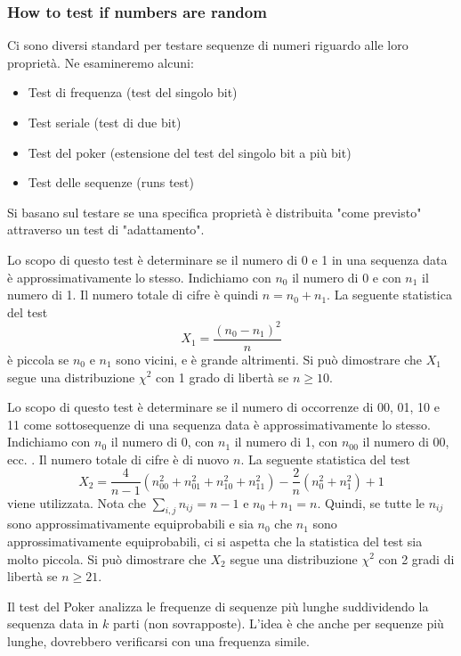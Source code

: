 \documentclass[11pt]{article}
\theoremstyle{definition} \newtheorem{definizione}{Definizione}[section] %
\begin{document}
        \subsubsection*{How to test if numbers are random}
        Ci sono diversi standard per testare sequenze di numeri riguardo alle loro proprietà. Ne esamineremo alcuni:

        \begin{itemize}
        \item Test di frequenza (test del singolo bit)
        \item Test seriale (test di due bit)
        \item Test del poker (estensione del test del singolo bit a più bit)
        \item Test delle sequenze (runs test)
        \end{itemize}

        Si basano sul testare se una specifica proprietà è distribuita "come previsto" attraverso un test di "adattamento".

        Lo scopo di questo test è determinare se il numero di 0 e 1 in una sequenza data è approssimativamente lo stesso. Indichiamo con \(n_0\) il numero di 0 e con \(n_1\) il numero di 1. Il numero totale di cifre è quindi \(n = n_0 + n_1\).
        La seguente statistica del test
        \[X_1 = \frac{(n_0 - n_1)^2}{n}\]
        è piccola se \(n_0\) e \(n_1\) sono vicini, e è grande altrimenti.
        Si può dimostrare che \(X_1\) segue una distribuzione \(\chi^2\) con 1 grado di libertà se \(n \geq 10\).

        Lo scopo di questo test è determinare se il numero di occorrenze di 00, 01, 10 e 11 come sottosequenze di una sequenza data è approssimativamente lo stesso. Indichiamo con \(n_0\) il numero di 0, con \(n_1\) il numero di 1, con \(n_{00}\) il numero di 00, ecc. . Il numero totale di cifre è di nuovo \(n\).
        La seguente statistica del test
        \[X_2 = \frac{4}{n-1} \left( n_{00}^2 + n_{01}^2 + n_{10}^2 + n_{11}^2 \right) - \frac{2}{n} \left( n_0^2 + n_1^2 \right) + 1\]
        viene utilizzata. Nota che \(\sum_{i,j} n_{ij} = n - 1\) e \(n_0 + n_1 = n\). Quindi, se tutte le \(n_{ij}\) sono approssimativamente equiprobabili e sia \(n_0\) che \(n_1\) sono approssimativamente equiprobabili, ci si aspetta che la statistica del test sia molto piccola.
        Si può dimostrare che \(X_2\) segue una distribuzione \(\chi^2\) con 2 gradi di libertà se \(n \geq 21\).
        
        
        Il test del Poker analizza le frequenze di sequenze più lunghe suddividendo la sequenza data in \(k\) parti (non sovrapposte). L'idea è che anche per sequenze più lunghe, dovrebbero verificarsi con una frequenza simile.
\end{document}
